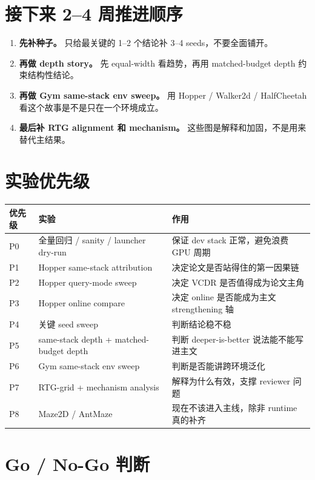 \documentclass[11pt,UTF8,fontset=fandol]{ctexart}
\begin{document}
\section{接下来 2--4 周推进顺序}

\begin{enumerate}
  \item \textbf{先补种子。} 只给最关键的 1--2 个结论补 3--4 seeds，不要全面铺开。
  \item \textbf{再做 depth story。} 先 equal-width 看趋势，再用 matched-budget depth 约束结构性结论。
  \item \textbf{再做 Gym same-stack env sweep。} 用 Hopper / Walker2d / HalfCheetah 看这个故事是不是只在一个环境成立。
  \item \textbf{最后补 RTG alignment 和 mechanism。} 这些图是解释和加固，不是用来替代主结果。
\end{enumerate}

\section{实验优先级}

\begin{tabularx}{\textwidth}{>{\raggedright\arraybackslash}p{} >{\raggedright\arraybackslash}p{} X}
\toprule
\textbf{优先级} & \textbf{实验} & \textbf{作用} \\
\midrule
P0 & 全量回归 / sanity / launcher dry-run & 保证 dev stack 正常，避免浪费 GPU 周期 \\
P1 & Hopper same-stack attribution & 决定论文是否站得住的第一因果链 \\
P2 & Hopper query-mode sweep & 决定 VCDR 是否值得成为论文主角 \\
P3 & Hopper online compare & 决定 online 是否能成为主文 strengthening 轴 \\
P4 & 关键 seed sweep & 判断结论稳不稳 \\
P5 & same-stack depth + matched-budget depth & 判断 deeper-is-better 说法能不能写进主文 \\
P6 & Gym same-stack env sweep & 判断是否能讲跨环境泛化 \\
P7 & RTG-grid + mechanism analysis & 解释为什么有效，支撑 reviewer 问题 \\
P8 & Maze2D / AntMaze & 现在不该进入主线，除非 runtime 真的补齐 \\
\bottomrule
\end{tabularx}

\section{Go / No-Go 判断}
\end{document}
